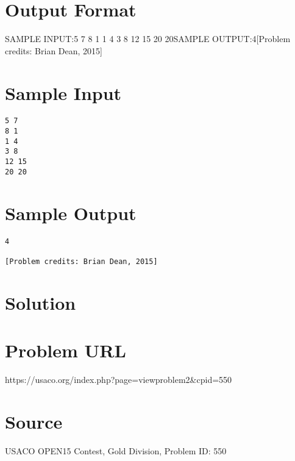 \documentclass[12pt]{article}
\begin{document}
\section*{Output Format}
SAMPLE INPUT:5 7
8 1
1 4
3 8
12 15
20 20SAMPLE OUTPUT:4[Problem credits: Brian Dean, 2015]

\section*{Sample Input}
\begin{verbatim}
5 7
8 1
1 4
3 8
12 15
20 20
\end{verbatim}

\section*{Sample Output}
\begin{verbatim}
4

[Problem credits: Brian Dean, 2015]
\end{verbatim}

\section*{Solution}


\section*{Problem URL}
https://usaco.org/index.php?page=viewproblem2&cpid=550

\section*{Source}
USACO OPEN15 Contest, Gold Division, Problem ID: 550
\end{document}

